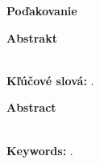 \ifdefined\podakovanie
	\newpage
	\null
	\vfill
	{\noindent\large\bf Poďakovanie} 
	\vspace{1.5cm}
	
	\podakovanie
	\vspace{1cm}
\fi
\thispagestyle{empty}

\newpage
{\noindent\large\bf Abstrakt}
\vspace{1cm}

\abstraktPoSlovensky \\

{\noindent \textbf{Kľúčové slová:} \emph{\klucoveSlovaPoSlovensky}.} 
\thispagestyle{empty}

\newpage
{\noindent\large\bf Abstract}
\vspace{1cm}
 
\abstraktPoAnglicky \\

{\noindent \textbf{Keywords:} \emph{\klucoveSlovaPoAnglicky}.}
\thispagestyle{empty}


\newpage
{}
\tableofcontents
\thispagestyle{empty}
\newpage{}
